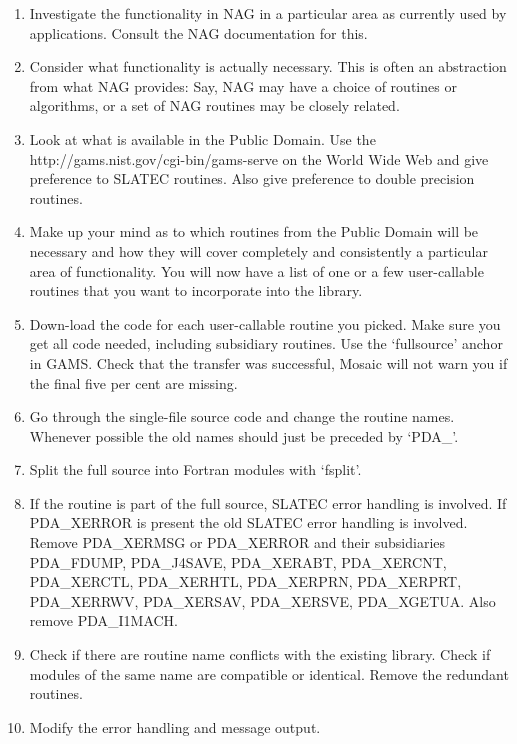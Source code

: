 \sloppy
\begin{enumerate}
\item 
   Investigate the functionality in NAG in a particular area as
   currently used by applications. Consult the NAG documentation for
   this.
\item 
   Consider what functionality is actually necessary. This is often an
   abstraction from what NAG provides: Say, NAG may have a choice of
   routines or algorithms, or a set of NAG routines may be closely
   related.
\item 
   Look at what is available in the Public Domain. Use the
{http://gams.nist.gov/cgi-bin/gams-serve}
   on the World Wide Web and give preference to SLATEC routines. Also give
   preference to double precision routines.
\item 
   Make up your mind as to which routines from the Public Domain will be
   necessary and how they will cover completely and consistently a
   particular area of functionality. You will now have a list of one or
   a few user-callable routines that you want to incorporate into the
   library.
\item 
   Down-load the code for each user-callable routine you picked. Make
   sure you get all code needed, including subsidiary routines. Use the
   `fullsource' anchor in GAMS. Check that the transfer was
   successful, Mosaic will not warn you if the final five per cent are
   missing.
\item 
   Go through the single-file source code and change the routine names.
   Whenever possible the old names should just be preceded by `PDA\_'.
\item 
   Split the full source into Fortran modules with `fsplit'.
\item
   If the routine
   is part of the full source, SLATEC error
   handling is involved. If PDA\_XERROR is present the old SLATEC error
   handling is involved. Remove PDA\_XERMSG or PDA\_XERROR and their
   subsidiaries PDA\_FDUMP, PDA\_J4SAVE, PDA\_XERABT, PDA\_XERCNT,
   PDA\_XERCTL, PDA\_XERHTL, PDA\_XERPRN, PDA\_XERPRT, PDA\_XERRWV,
   PDA\_XERSAV, PDA\_XERSVE, PDA\_XGETUA. Also remove PDA\_I1MACH.
\item 
   Check if there are routine name conflicts with the existing library.
   Check if modules of the same name are compatible or identical. Remove
   the redundant routines.
\item 
   Modify the error handling and message output.
   \begin{itemize}

\end{itemize}
\end{enumerate}
